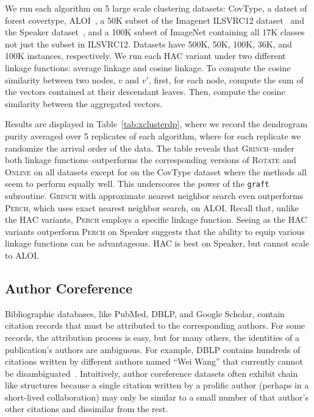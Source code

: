 \documentclass{article} \usepackage[utf8]{inputenc} \usepackage[T1]{fontenc}    \usepackage{hyperref}       \usepackage{url}            \usepackage{booktabs}       \usepackage{amsfonts}       \usepackage{nicefrac}       \usepackage{microtype}      \usepackage{geometry}
\newcommand{\perch}{\textsc{Perch}\xspace}
\newcommand{\alg}{\textsc{Grinch}\xspace}
\newcommand{\algrotate}{\textsc{Rotate}\xspace}
\newcommand{\hac}{\textsc{HAC}\xspace}
\newcommand{\greedy}{\textsc{Online}\xspace}
\newcommand{\graft}{\texttt{graft}\xspace}
\newcommand{\hofs}{linkage functions\xspace}
\begin{document}
We run each algorithm on 5 large scale clustering datasets: CovType,
a datset of forest covertype,
ALOI~\cite{geusebroek2005amsterdam}, a 50K subset of the Imagenet
ILSVRC12 dataset~\cite{russakovsky2015imagenet} and the Speaker
dataset~\cite{greenberg2014nist}, and a 100K subset of
ImageNet containing all 17K classes not just the subset
in ILSVRC12. Datasets have 500K, 50K, 100K, 36K, and 100K
instances, respectively. We run each \hac variant under two different
\hofs: average linkage and cosine linkage.  To compute the cosine
similarity between two nodes, $v$ and $v'$, first, for each node,
compute the sum of the vectors contained at their descendant
leaves. Then, compute the cosine similarity between the aggregated
vectors.

Results are displayed in Table~\ref{tab:xclusterdp}, where we record
the dendrogram purity averaged over 5 replicates of each algorithm,
where for each replicate we randomize the arrival order of the
data. The table reveals that \alg--under both linkage functions--outperforms
the corresponding versions of \algrotate and \greedy on all datasets
except for on the CovType dataset where the methods all seem to perform
equally well. This underscores
the power of the \graft subroutine. \alg with approximate nearest
neighbor search even outperforms \perch, which uses exact nearest
neighbor search, on ALOI.  Recall that, unlike the \hac variants,
\perch employs a specific linkage function. Seeing as the \hac
variants outperform \perch on Speaker suggests that the ability to
equip various \hofs can be advantageous. \hac is best on Speaker, but
cannot scale to ALOI.

\subsection{Author Coreference}
\label{subsec:coref}
Bibliographic databases, like PubMed, DBLP, and Google Scholar,
contain citation records that must be attributed to the corresponding
authors. For some records, the attribution process is easy, but for
many others, the identities of a publication's authors are ambiguous.
For example, DBLP contains hundreds of citations written by different
authors named ``Wei Wang'' that currently cannot be
disambiguated~\cite{dblp:wei}. Intuitively, author coreference
datasets often exhibit chain like structures because a single citation
written by a prolific author (perhaps in a short-lived collaboration)
may only be similar to a small number of that author's other citations
and dissimilar from the rest.
\end{document}
